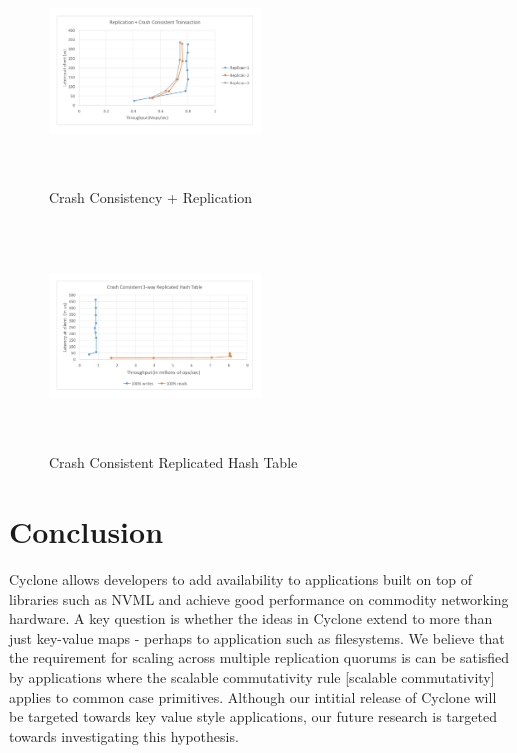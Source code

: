 \documentclass[letterpaper,twocolumn,10pt]{article}
\begin{document}
\begin{figure}
  \includegraphics[width=0.5\textwidth,height=6cm]{results/cc_mops.pdf}
  \caption{Crash Consistency + Replication}
  \label{fig:cc_rep}
\end{figure}

\begin{figure}
  \includegraphics[width=0.5\textwidth,height=6cm]{results/app_mops.pdf}
  \caption{Crash Consistent Replicated Hash Table}
  \label{fig:app_rep}
\end{figure}

\section{Conclusion}
Cyclone allows developers to add availability to applications built on top of
libraries such as NVML and achieve good performance on commodity networking
hardware. A key question is whether the ideas in Cyclone extend to more than
just key-value maps - perhaps to application such as filesystems. We believe
that the requirement for scaling across multiple replication quorums is
can be satisfied by applications where the scalable commutativity rule [scalable
commutativity] applies to common case primitives. Although our intitial release
of Cyclone will be targeted towards key value style applications, our future
research is targeted towards investigating this hypothesis.
\end{document}
